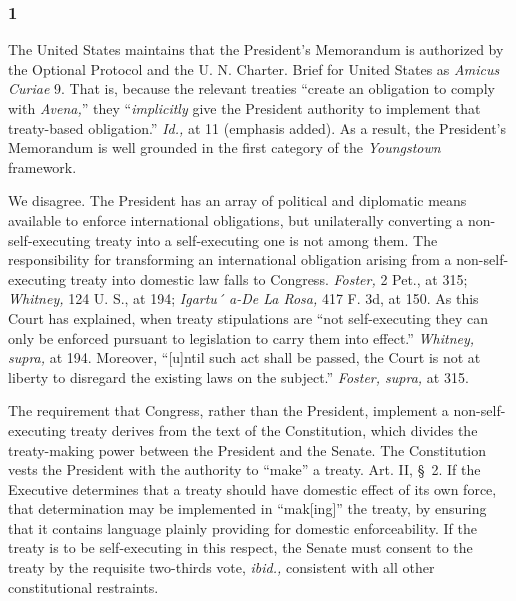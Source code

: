 {\subsubsection{1}

  The United States maintains that the President's Memorandum is
authorized by the Optional Protocol and the U. N. Charter. Brief for
United States as \emph{Amicus Curiae} 9. That is, because the relevant
treaties ``create an obligation to comply with \emph{Avena,}'' they
``\emph{implicitly} give the President authority to implement that
treaty-based obligation.'' \emph{Id.,} at 11 (emphasis added). As
a result, the President's Memorandum is well grounded in the first
category of the \emph{Youngstown} framework.

  We disagree. The President has an array of political and diplomatic
means available to enforce international obligations, but unilaterally
converting a non-self-executing treaty into a self-executing one is
not among them. The responsibility for transforming an international
obligation arising from a non-self-executing treaty into domestic law
falls to \newpage  Congress. \emph{Foster,} 2 Pet., at 315; \emph{Whitney,}
124 U. S., at 194; \emph{Igartu´ a-De La Rosa,} 417 F. 3d, at 150.
As this Court has explained, when treaty stipulations are ``not
self-executing they can only be enforced pursuant to legislation to
carry them into effect.'' \emph{Whitney, supra,} at 194. Moreover,
``[u]ntil such act shall be passed, the Court is not at liberty to
disregard the existing laws on the subject.'' \emph{Foster, supra,} at
315.

  The requirement that Congress, rather than the President, implement
a non-self-executing treaty derives from the text of the Constitution,
which divides the treaty-making power between the President and the
Senate. The Constitution vests the President with the authority to
``make'' a treaty. Art. II, \S~2. If the Executive determines
that a treaty should have domestic effect of its own force, that
determination may be implemented in ``mak[ing]'' the treaty, by
ensuring that it contains language plainly providing for domestic
enforceability. If the treaty is to be self-executing in this respect,
the Senate must consent to the treaty by the requisite two-thirds vote,
\emph{ibid.,} consistent with all other constitutional restraints.

}
